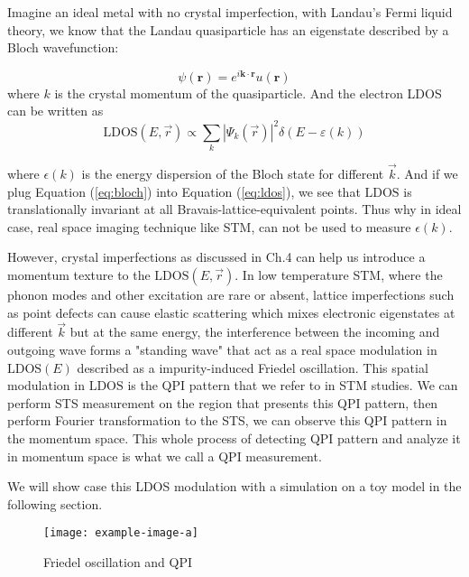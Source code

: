 Imagine an ideal metal with no crystal imperfection, with Landau's Fermi liquid theory, we know that the Landau quasiparticle has an eigenstate described by a Bloch wavefunction: 

\begin{equation}
\psi(\mathbf{r}) = e^{i \mathbf{k} \cdot \mathbf{r}} u(\mathbf{r})
\label{eq:bloch}
\end{equation} 
where $k$ is the crystal momentum of the quasiparticle. And the electron \ac{LDOS} can be written as  
\begin{equation}
\text{LDOS}(E, \vec{r}) \propto \sum_k |\Psi_k(\vec{r})|^2 \delta(E - \varepsilon(k))
\label{eq:ldos}
\end{equation}

where  $\epsilon(k)$ is the energy dispersion of the Bloch state for different $\vec{k}$. And if we plug Equation (\ref{eq:bloch}) into Equation (\ref{eq:ldos}), we see that $\text{LDOS}$ is translationally invariant at all Bravais-lattice-equivalent points. Thus why in ideal case, real space imaging technique like \ac{STM}, can not be used to measure $\epsilon(k)$. 

However, crystal imperfections as discussed in Ch.4 can help us introduce a momentum texture to the $\text{LDOS}(E, \vec{r})$. In low temperature STM, where the phonon modes and other excitation are rare or absent, lattice imperfections such as point defects can cause elastic scattering which mixes electronic eigenstates at different $\vec{k}$ but at the same energy, the interference between the incoming and outgoing wave forms a "standing wave" that act as a real space modulation in $\text{LDOS}(E)$ described as a impurity-induced Friedel oscillation\cite{bena_friedel_2016}. This spatial modulation in $\text{LDOS}$ is the QPI pattern that we refer to in STM studies. We can perform \ac{STS} measurement on the region that presents this QPI pattern, then perform Fourier transformation to the STS, we can observe this QPI pattern in the momentum space. This whole process of detecting QPI pattern and analyze it in momentum space is what we call a QPI measurement. 

We will show case this \ac{LDOS} modulation with a simulation on a toy model in the following section. 

\begin{figure}
	\centering
	\texttt{[image: example-image-a]} %
	\caption{Friedel oscillation and QPI}
	\label{fig:example}
\end{figure}

